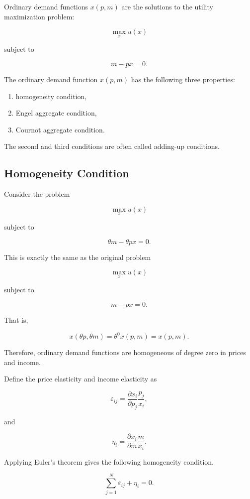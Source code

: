 Ordinary demand functions \(x(p,m)\) are the solutions to the utility maximization problem:

\[
\max_x u(x)
\]

subject to

\[
m - px = 0.
\]

The ordinary demand function \(x(p,m)\) has the following three properties:

\begin{enumerate}
    \item homogeneity condition,
    \item Engel aggregate condition,
    \item Cournot aggregate condition.
\end{enumerate}

The second and third conditions are often called adding-up conditions.

\subsection{Homogeneity Condition}

Consider the problem

\[
\max_x u(x)
\]

subject to

\[
\theta m - \theta px = 0.
\]

This is exactly the same as the original problem

\[
\max_x u(x)
\]

subject to

\[
m - px = 0.
\]

That is,

\[
x(\theta p,\theta m)
=
\theta^0 x(p,m)
=
x(p,m).
\]

Therefore, ordinary demand functions are homogeneous of degree zero in prices and income.

Define the price elasticity and income elasticity as

\[
\varepsilon_{ij}
=
\frac{\partial x_i}{\partial p_j}
\frac{p_j}{x_i},
\]

and

\[
\eta_i
=
\frac{\partial x_i}{\partial m}
\frac{m}{x_i}.
\]

Applying Euler's theorem gives the following homogeneity condition.

\begin{condition}[Homogeneity]
\[
\sum_{j=1}^N \varepsilon_{ij} + \eta_i = 0.
\]
\end{condition}

